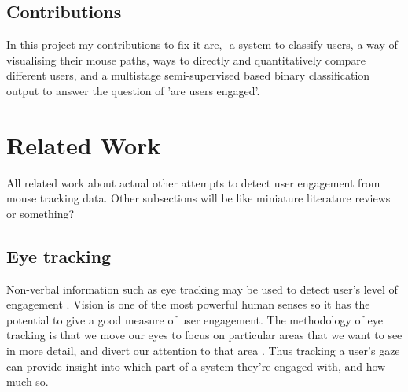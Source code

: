 \documentclass{article}
\begin{document}
\subsection{Contributions}

In this project my contributions to fix it are, -a system to classify users, a way of visualising their mouse paths, ways to directly and quantitatively compare different users, and a multistage semi-supervised based binary classification output to answer the question of 'are users engaged'.

\section{Related Work}


All related work about actual other attempts to detect user engagement from mouse tracking data.
Other subsections will be like miniature literature reviews or something?


\subsection{Eye tracking}

Non-verbal information such as eye tracking may be used to detect user’s level of engagement \cite{lala2017detection}.
Vision is one of the most powerful human senses so it has the potential to give a good measure of user engagement. 
The methodology of eye tracking is that we move our eyes to focus on particular areas that we want to see in more detail, and divert our attention to that area \cite{duchowski2007eye}. 
Thus tracking a user’s gaze can provide insight into which part of a system they’re engaged with, and how much so.
\end{document}
